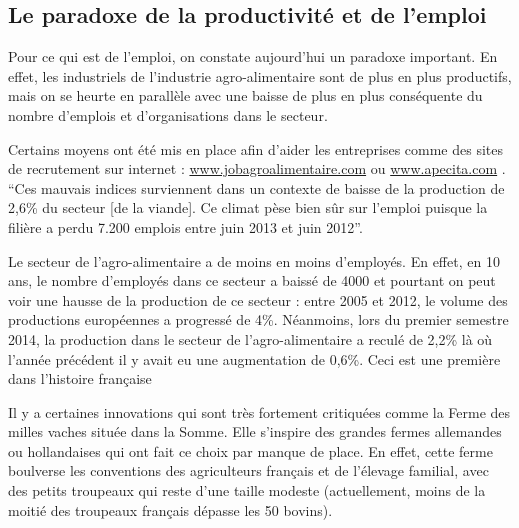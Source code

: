 \documentclass[a4paper,12pt]{report}
\begin{document}
		\subsection{Le paradoxe de la productivité et de l'emploi}
			Pour ce qui est de l’emploi, on constate aujourd'hui un paradoxe important. En effet, les industriels de l’industrie agro-alimentaire sont de plus en plus productifs, mais on se heurte en parallèle avec une baisse de plus en plus conséquente du nombre d’emplois et d’organisations dans le secteur.
			
			Certains moyens ont été mis en place afin d’aider les entreprises comme des sites de recrutement sur internet : \url{www.jobagroalimentaire.com} ou \url{www.apecita.com} .  “Ces mauvais indices surviennent dans un contexte de baisse de la production de 2,6\% du secteur [de la viande]. Ce climat pèse bien sûr sur l'emploi puisque la filière a perdu 7.200 emplois entre juin 2013 et juin 2012”\cite{DeficitCommercialViandeAggrave}.
			
			Le secteur de l’agro-alimentaire a de moins en moins d’employés. En effet, en 10 ans, le nombre d’employés dans ce secteur a baissé de 4000\cite{IAAHeritageAgricoleBretagne} et pourtant on peut voir une hausse de la production de ce secteur : entre 2005 et 2012, le volume des productions européennes a progressé de 4\%\cite{HausseModereeVenteProduitsAA2012}. Néanmoins, lors du premier semestre 2014, la production dans le secteur de l’agro-alimentaire a reculé de 2,2\% là où l’année précédent il y avait eu une augmentation de 0,6\%\cite{ReculHistoriqueProductionAAFrance}. Ceci est une première dans l’histoire française
			
			Il y a certaines innovations qui sont très fortement critiquées comme la Ferme des milles vaches située dans la Somme\cite{Ferme1000Vaches}. Elle s'inspire des grandes fermes allemandes ou hollandaises qui ont fait ce choix par manque de place. En effet, cette ferme boulverse les conventions des agriculteurs français et de l'élevage familial, avec des petits troupeaux qui reste d’une taille modeste (actuellement, moins de la moitié des troupeaux français dépasse les 50 bovins).
			
\end{document}

